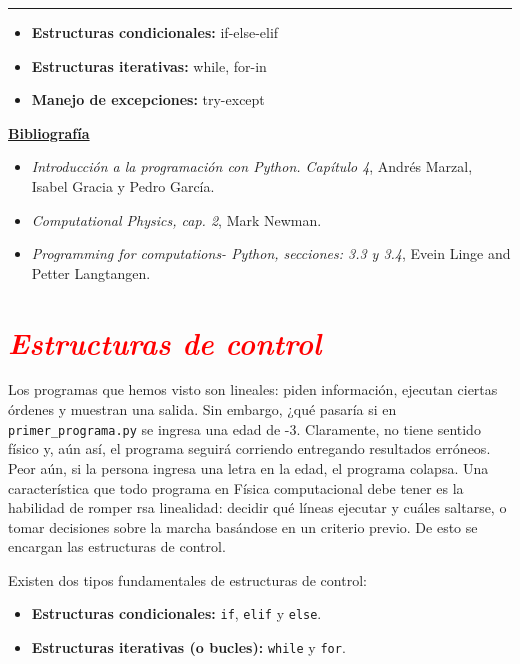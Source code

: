 \documentclass[12pt]{article}
\begin{document}
		\thispagestyle{firstpage}
		\vspace*{1.5cm}
	
	\begin{center}
		\rule{\textwidth}{0.4pt}
	\end{center}
	
	\begin{itemize}[leftmargin=*,label=\textcolor{red}{\ensuremath{\blacktriangleright}}]
		\item \textbf{Estructuras condicionales:} if-else-elif 
		\item \textbf{Estructuras iterativas:} while, for-in
        \item \textbf{Manejo de excepciones:} try-except
	\end{itemize}
	
	\noindent
	\textbf{\underline{Bibliografía}}
	\begin{itemize}[leftmargin=*, label={\textcolor{blue}{$\bullet$}}]
		\item \textit{Introducción a la programación con Python. Capítulo 4}, Andrés Marzal, Isabel Gracia y Pedro García.
		\item \textit{Computational Physics, cap. 2}, Mark Newman.
		\item \textit{Programming for computations- Python,  secciones: 3.3 y 3.4}, Evein Linge and 
        Petter Langtangen.
	\end{itemize}
     
    

\section*{\textcolor{red}{\textit{Estructuras de control}}}
	Los programas que hemos visto son lineales: piden información,
    ejecutan ciertas órdenes y muestran una salida. Sin embargo, ¿qué pasaría
    si en \lstinline|primer_programa.py| se ingresa una edad de -3. Claramente, 
    no tiene sentido físico y, aún así, el programa seguirá corriendo entregando
    resultados erróneos. Peor aún, si la persona ingresa una letra en la edad, 
    el programa colapsa.  Una característica que todo programa en 
    Física computacional debe tener es la habilidad de romper rsa linealidad:
    decidir qué líneas ejecutar y cuáles saltarse, o tomar decisiones sobre la marcha
    basándose en un criterio previo. De esto se encargan las estructuras de control.

    Existen dos tipos fundamentales de estructuras de control:
\begin{itemize}
    \item \textbf{Estructuras condicionales:} \lstinline|if|, \lstinline|elif| y \lstinline|else|.
    \item \textbf{Estructuras iterativas (o bucles):} \lstinline|while| y \lstinline|for|.
\end{itemize}
\end{document}
